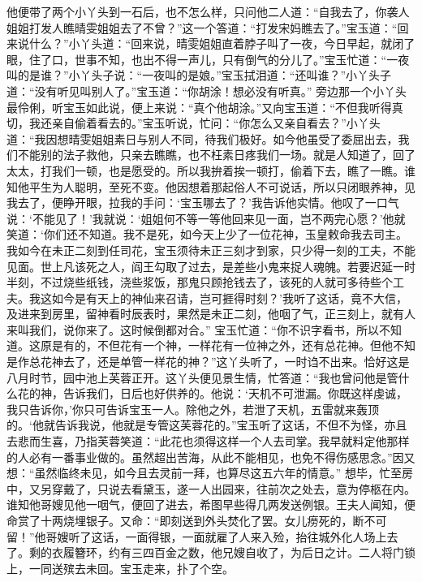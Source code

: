 \documentclass[12pt,oneside]{book}
\begin{document}
他便带了两个小丫头到一石后，也不怎么样，只问他二人道：“自我去了，你袭人姐姐打发人瞧晴雯姐姐去了不曾？”这一个答道：“打发宋妈瞧去了。”宝玉道：“回来说什么？”小丫头道：“回来说，晴雯姐姐直着脖子叫了一夜，今日早起，就闭了眼，住了口，世事不知，也出不得一声儿，只有倒气的分儿了。”宝玉忙道：“一夜叫的是谁？”小丫头子说：“一夜叫的是娘。”宝玉拭泪道：“还叫谁？”小丫头子道：“没有听见叫别人了。”宝玉道：“你胡涂！想必没有听真。”
旁边那一个小丫头最伶俐，听宝玉如此说，便上来说：“真个他胡涂。”又向宝玉道：“不但我听得真切，我还亲自偷着看去的。”宝玉听说，忙问：“你怎么又亲自看去？”小丫头道：“我因想晴雯姐姐素日与别人不同，待我们极好。如今他虽受了委屈出去，我们不能别的法子救他，只亲去瞧瞧，也不枉素日疼我们一场。就是人知道了，回了太太，打我们一顿，也是愿受的。所以我拚着挨一顿打，偷着下去，瞧了一瞧。谁知他平生为人聪明，至死不变。他因想着那起俗人不可说话，所以只闭眼养神，见我去了，便睁开眼，拉我的手问：‘宝玉哪去了？’我告诉他实情。他叹了一口气说：‘不能见了！’我就说：‘姐姐何不等一等他回来见一面，岂不两完心愿？’他就笑道：‘你们还不知道。我不是死，如今天上少了一位花神，玉皇敕命我去司主。我如今在未正二刻到任司花，宝玉须待未正三刻才到家，只少得一刻的工夫，不能见面。世上凡该死之人，阎王勾取了过去，是差些小鬼来捉人魂魄。若要迟延一时半刻，不过烧些纸钱，浇些浆饭，那鬼只顾抢钱去了，该死的人就可多待些个工夫。我这如今是有天上的神仙来召请，岂可捱得时刻？’我听了这话，竟不大信，及进来到房里，留神看时辰表时，果然是未正二刻，他咽了气，正三刻上，就有人来叫我们，说你来了。这时候倒都对合。”
宝玉忙道：“你不识字看书，所以不知道。这原是有的，不但花有一个神，一样花有一位神之外，还有总花神。但他不知是作总花神去了，还是单管一样花的神？”这丫头听了，一时诌不出来。恰好这是八月时节，园中池上芙蓉正开。这丫头便见景生情，忙答道：“我也曾问他是管什么花的神，告诉我们，日后也好供养的。他说：‘天机不可泄漏。你既这样虔诚，我只告诉你，’你只可告诉宝玉一人。除他之外，若泄了天机，五雷就来轰顶的。‘他就告诉我说，他就是专管这芙蓉花的。”宝玉听了这话，不但不为怪，亦且去悲而生喜，乃指芙蓉笑道：“此花也须得这样一个人去司掌。我早就料定他那样的人必有一番事业做的。虽然超出苦海，从此不能相见，也免不得伤感思念。”因又想：“虽然临终未见，如今且去灵前一拜，也算尽这五六年的情意。”
想毕，忙至房中，又另穿戴了，只说去看黛玉，遂一人出园来，往前次之处去，意为停柩在内。谁知他哥嫂见他一咽气，便回了进去，希图早些得几两发送例银。王夫人闻知，便命赏了十两烧埋银子。又命：“即刻送到外头焚化了罢。女儿痨死的，断不可留！”他哥嫂听了这话，一面得银，一面就雇了人来入殓，抬往城外化人场上去了。剩的衣履簪环，约有三四百金之数，他兄嫂自收了，为后日之计。二人将门锁上，一同送殡去未回。宝玉走来，扑了个空。
\end{document}
